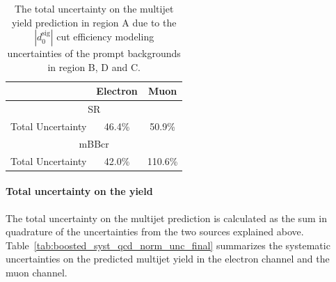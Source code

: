 \begin{table}[!htbp]
\begin{center}
\begin{tabular}{c|c|c}
& Electron  & Muon  \\  
\hline
\multicolumn{3}{c}{SR} \\
\hline
Total Uncertainty          &  46.4\%  &  50.9\%   \\
\hline
\multicolumn{3}{c}{mBBcr} \\
\hline
Total Uncertainty          &  42.0\%  &  110.6\%   \\
\hline
\end{tabular}
\end{center}
\caption{The total uncertainty on the multijet yield prediction in region A due to the $|d_{0}^{\textrm{sig}}|$
cut efficiency modeling uncertainties of the prompt backgrounds in region B, D and C.}
\label{tab:boosted_syst_qcd_norm_d0sigacc}
\end{table}
 
\paragraph{Total uncertainty on the yield}
 The total uncertainty on the multijet prediction
is calculated as the sum in quadrature of the uncertainties from the two sources explained above.
Table~\ref{tab:boosted_syst_qcd_norm_unc_final} summarizes the systematic uncertainties on the predicted
multijet yield in the electron channel and the muon channel.
 
